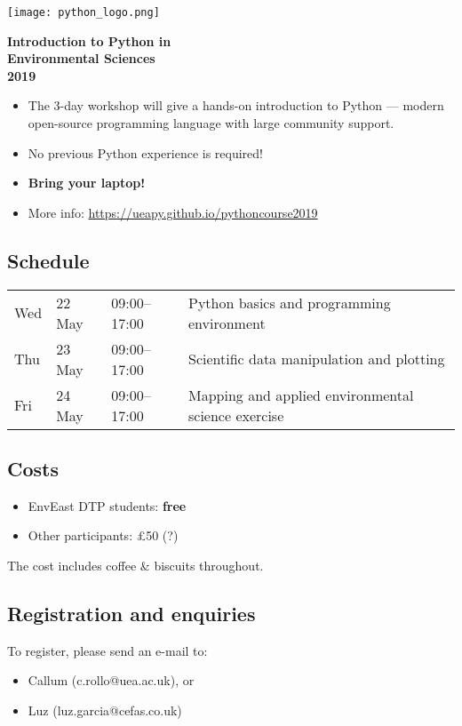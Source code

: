 \documentclass[paper=a4]{scrartcl}
\newcommand*{\pyitem}{\item [{\texttt{[image: python\_logo.png]}}]}
\begin{document}
\pagestyle{empty} %

\begin{center}
\begin{minipage}{0.2\linewidth}
    \texttt{[image: python\_logo.png]}
    \vspace{0.5cm}
\end{minipage}

\Huge \textbf{Introduction to Python in \\ Environmental Sciences \\ 2019}

\end{center}

\begin{itemize}
\pyitem The 3-day workshop will give a hands-on introduction to Python --- modern open-source programming language with large community support.
\pyitem No previous Python experience is required!
\pyitem \textbf{Bring your laptop!}
\pyitem More info: \url{https://ueapy.github.io/pythoncourse2019}
\end{itemize}


\subsection*{Schedule}
\begin{center}
\begin{tabular}{llll}
Wed & 22 May & 09:00--17:00 & Python basics and programming environment\\
Thu & 23 May & 09:00--17:00 & Scientific data manipulation and plotting \\
Fri & 24 May & 09:00--17:00 & Mapping and applied environmental science exercise\\
\end{tabular}
\end{center}


\subsection*{Costs}
\begin{itemize}
\pyitem EnvEast DTP students: \textbf{free}
\pyitem Other participants: \pounds 50 (?)
\end{itemize}
\vspace{-0.5cm}
\scriptsize The cost includes coffee \& biscuits throughout. \normalsize

\subsection*{Registration and enquiries}
To register, please send an e-mail to:
\begin{itemize}
\pyitem Callum (c.rollo@uea.ac.uk), or
\pyitem Luz (luz.garcia@cefas.co.uk)
\end{itemize}
\end{document}
